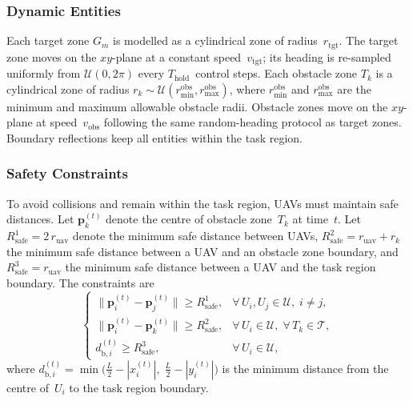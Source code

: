 \subsubsection{Dynamic Entities}

Each target zone $G_m$ is modelled as a cylindrical zone of radius~$r_{\mathrm{tgt}}$.
The target zone moves on the $xy$-plane at a constant speed~$v_{\mathrm{tgt}}$;
its heading is re-sampled uniformly from $\mathcal{U}(0, 2\pi)$ every
$T_{\mathrm{hold}}$~control steps.
Each obstacle zone $T_k$ is a cylindrical zone of radius
$r_k \sim \mathcal{U}(r_{\min}^{\mathrm{obs}}, r_{\max}^{\mathrm{obs}})$,
where $r_{\min}^{\mathrm{obs}}$ and $r_{\max}^{\mathrm{obs}}$ are the minimum
and maximum allowable obstacle radii.
Obstacle zones move on the $xy$-plane at speed~$v_{\mathrm{obs}}$ following
the same random-heading protocol as target zones.
Boundary reflections keep all entities within the task region.

\subsubsection{Safety Constraints}

To avoid collisions and remain within the task region, UAVs must maintain safe
distances.
Let $\mathbf{p}_k^{(t)}$ denote the centre of obstacle zone~$T_k$ at
time~$t$.
Let $R_{\mathrm{safe}}^{1} = 2\,r_{\mathrm{uav}}$ denote the minimum safe
distance between UAVs,
$R_{\mathrm{safe}}^{2} = r_{\mathrm{uav}} + r_k$ the minimum safe distance
between a UAV and an obstacle zone boundary, and
$R_{\mathrm{safe}}^{3} = r_{\mathrm{uav}}$ the minimum safe distance
between a UAV and the task region boundary.
The constraints are
\begin{equation}
  \begin{cases}
    \lVert\mathbf{p}_i^{(t)} - \mathbf{p}_j^{(t)}\rVert
      \ge R_{\mathrm{safe}}^{1},
    & \forall\, U_i, U_j \in \mathcal{U},\; i \ne j, \\[4pt]
    \lVert\mathbf{p}_i^{(t)} - \mathbf{p}_k^{(t)}\rVert
      \ge R_{\mathrm{safe}}^{2},
    & \forall\, U_i \in \mathcal{U},\;
      \forall\, T_k \in \mathcal{T}, \\[4pt]
    d_{\mathrm{b},i}^{(t)} \ge R_{\mathrm{safe}}^{3},
    & \forall\, U_i \in \mathcal{U},
  \end{cases}
  \label{eq:safety}
\end{equation}
where
$d_{\mathrm{b},i}^{(t)} = \min\!\bigl(
  \tfrac{L}{2} - |x_i^{(t)}|,\;
  \tfrac{L}{2} - |y_i^{(t)}|
\bigr)$
is the minimum distance from the centre of~$U_i$ to the task region boundary.

